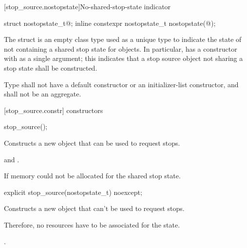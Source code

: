 {%
[stop_source.nostopstate]{No-shared-stop-state indicator}

%
%
\begin{itemdecl}
struct nostopstate_t{@\seebelow@};
inline constexpr nostopstate_t nostopstate(@\unspec@);
\end{itemdecl}

\pnum
The struct  is an empty class type used as a unique type to indicate the state of
not containing a shared stop state for  objects.
In particular,  has a constructor with  as a single argument;
this indicates that a stop source object not sharing a stop state shall be constructed.

\pnum
Type  shall not have a default constructor or an initializer-list constructor, and shall not be an aggregate.

[stop_source.constr]{ constructors}

%
\begin{itemdecl}
stop_source();
\end{itemdecl}
\begin{itemdescr}
  \pnum\effects Constructs a new  object that can be used to request stops.
  
  \pnum\postconditions {} and .

  \pnum\throws {} If memory could not be allocated for the shared stop state.
\end{itemdescr}

%
\begin{itemdecl}
explicit stop_source(nostopstate_t) noexcept;
\end{itemdecl}
\begin{itemdescr}
  \pnum\effects Constructs a new  object that can't be used to request stops.
                \begin{note} Therefore, no resources have to be associated for the state.  \end{note}

  \pnum\postconditions {}.
\end{itemdescr}


}
